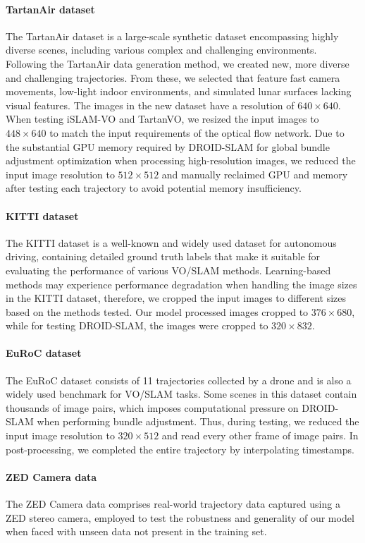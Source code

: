 \paragraph{TartanAir dataset}
The TartanAir dataset is a large-scale synthetic dataset encompassing highly diverse scenes, including various complex and challenging environments. 
Following the TartanAir data generation method, we created new, more diverse and challenging trajectories. 
From these, we selected that feature fast camera movements, low-light indoor environments, and simulated lunar surfaces lacking visual features. The images in the new dataset have a resolution of \(640 \times 640\). 
When testing iSLAM-VO and TartanVO, we resized the input images to \(448 \times 640\) to match the input requirements of the optical flow network. Due to the substantial GPU memory required by DROID-SLAM for global bundle adjustment optimization when processing high-resolution images, we reduced the input image resolution to \(512 \times 512 \) and manually reclaimed GPU and memory after testing each trajectory to avoid potential memory insufficiency.

\paragraph{KITTI dataset}
The KITTI dataset is a well-known and widely used dataset for autonomous driving, containing detailed ground truth labels that make it suitable for evaluating the performance of various VO/SLAM methods. 
Learning-based methods may experience performance degradation when handling the image sizes in the KITTI dataset, therefore, we cropped the input images to different sizes based on the methods tested. Our model processed images cropped to \( 376\times680\), while for testing DROID-SLAM, the images were cropped to \( 320 \times 832\).

\paragraph{EuRoC dataset}
 The EuRoC dataset consists of 11 trajectories collected by a drone and is also a widely used benchmark for VO/SLAM tasks. Some scenes in this dataset contain thousands of image pairs, which imposes computational pressure on DROID-SLAM when performing bundle adjustment. Thus, during testing, we reduced the input image resolution to \( 320 \times 512\) and read every other frame of image pairs. In post-processing, we completed the entire trajectory by interpolating timestamps.

\paragraph{ZED Camera data}
The ZED Camera data comprises real-world trajectory data captured using a ZED stereo camera, employed to test the robustness and generality of our model when faced with unseen data not present in the training set.
